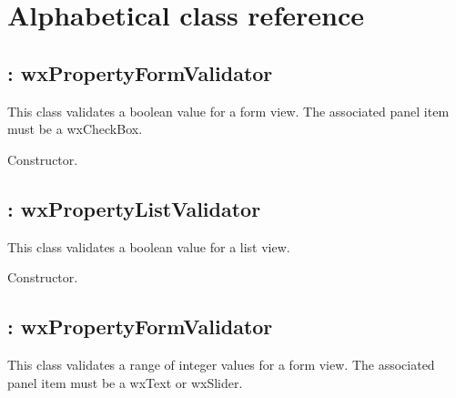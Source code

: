 \chapter{Alphabetical class reference}\label{classref}
%
\setfooter{\thepage}{}{}{}{}{\thepage}%


\section{: wxPropertyFormValidator}\label{wxboolformvalidator}


This class validates a boolean value for a form view. The associated panel item must be a wxCheckBox.



Constructor.

\section{: wxPropertyListValidator}\label{wxboollistvalidator}


This class validates a boolean value for a list view.



Constructor.

\section{: wxPropertyFormValidator}\label{wxintegerformvalidator}


This class validates a range of integer values for a form view. The associated panel item must be a wxText
or wxSlider.


